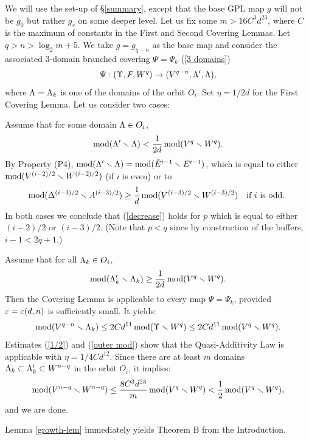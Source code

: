 \begin{pf}
We will use the set-up of \S \ref{summary}, except that the base GPL map $g$ will not be $g_0$
but rather $g_s$ on some deeper level.
Let us fix some $m > 16 C^3 d^{23}$,
where $C$ is the maximum of  constants in the First and Second Covering Lemmas.
Let $q> n > \log_2 m+ 5$. 
We take $g = g_{q-n}$ as the base map
and consider the associated 3-domain branched covering $\Psi=\Psi_k$ (\ref{3 domains}) 
$$
   \Psi: (\Upsilon, F, W^q) \rightarrow (V^{q-n}, {\Lambda}', {\Lambda}),  
$$
where ${\Lambda}={\Lambda}_k$ is one of the domains of the orbit $O_i$.  
Set $\eta=1/2d$ for the First Covering Lemma. 
Let us consider two cases:

 Assume that for some domain ${\Lambda}\in O_i$, 
$$
  \operatorname{mod} ({\Lambda}'\smallsetminus {\Lambda})< \frac{1}{2d} \operatorname{mod} (V^q\smallsetminus W^q).
$$
         By Property (P4), 
$\operatorname{mod}({\Lambda}' \smallsetminus {\Lambda}) = \operatorname{mod} (\hat E^{i-1}\smallsetminus  E^{i-1})$, which is equal to either
$\operatorname{mod}(V^{(i-2)/2}\smallsetminus W^{(i-2)/2})$ (if $i$ is even) or to
$$
   \operatorname{mod}({\Delta}^{(i-3)/2}\smallsetminus A^{(i-3)/2}) \geq \frac{1}{d} \operatorname{mod} (V^{(i-3)/2}\smallsetminus W^{(i-3)/2})  \quad \mbox{if $i$ is odd. }
$$   
In both cases we conclude that (\ref{decrease}) holds  for   
$p$ which  is equal  to either $(i-2)/2$ or $(i-3)/2$.
(Note that $p<q$ since by construction of the  buffers, $i-1 <  2q+1$.)     

 Assume that for all ${\Lambda}_k\in O_i$, 
\begin{equation}\label{1/2}
  \operatorname{mod} ({\Lambda}_k'\smallsetminus {\Lambda}_k) \geq \frac{1}{2d} \operatorname{mod} (V^q\smallsetminus W^q).
\end{equation}
Then  the  Covering Lemma is applicable to every map $\Psi = \Psi_k$, 
provided ${\varepsilon}={\varepsilon}(d,n)$ is sufficiently small. 
It yields:
\begin{equation}\label{outer mod}
  \operatorname{mod} (V^{q-n}\smallsetminus {\Lambda}_k) \leq 2C d^{11} \operatorname{mod}(\Upsilon\smallsetminus W^q) \leq 2C d^{11} \operatorname{mod}(V^q\smallsetminus W^q). 
\end{equation}
Estimates (\ref{1/2}) and (\ref{outer mod}) show that the Quasi-Additivity Law is applicable
with $\eta=1/4Cd^{12}$.
 Since there are at least $m$ domains ${\Lambda}_k\subset {\Lambda}_k'\subset W^{n-q}$ in the orbit $O_i$,
it implies:
$$
      \operatorname{mod}(V^{n-q}\smallsetminus W^{n-q}) \leq \frac{8 C^3 d^{23}}{m} \operatorname{mod}(V^q\smallsetminus W^q) < \frac{1}{2} \operatorname{mod}(V^q\smallsetminus W^q),
$$
and we are done.  
\end{pf}


Lemma \ref{growth-lem} immediately yields Theorem B from the Introduction.






